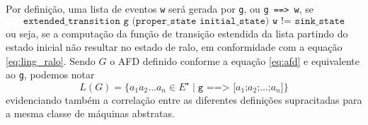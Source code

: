 Por definição, uma lista de eventos \texttt{w} será gerada por \texttt{g}, ou \texttt{g ==> w}, se $$\texttt{extended\_transition g (proper\_state initial\_state) w != sink\_state}$$ ou seja, se a computação da função de transição estendida da lista partindo do estado inicial não resultar no estado de ralo, em conformidade com a equação \ref{eq:ling_ralo}. Sendo $G$ o AFD definido conforme a equação \ref{eq:afd} e equivalente ao \texttt{g}, podemos notar $$L(G) = \{ a_1a_2...a_n \in E^\star \mid \texttt{g ==> [$a_1$;$a_2$;$...$;$a_n$]} \}$$ evidenciando também a correlação entre as diferentes definições supracitadas para a mesma classe de máquinas abstratas.